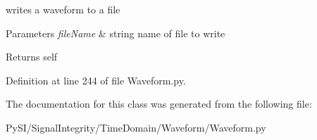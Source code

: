 writes a waveform to a file 


\begin{DoxyParams}{Parameters}
{\em file\+Name} & string name of file to write \\
\hline
\end{DoxyParams}
\begin{DoxyReturn}{Returns}
self 
\end{DoxyReturn}


Definition at line 244 of file Waveform.\+py.



The documentation for this class was generated from the following file\+:\begin{DoxyCompactItemize}
\item 
Py\+S\+I/\+Signal\+Integrity/\+Time\+Domain/\+Waveform/Waveform.\+py\end{DoxyCompactItemize}
